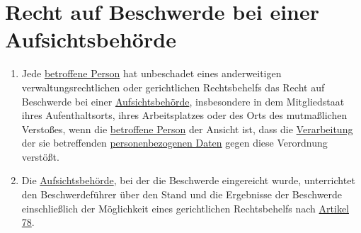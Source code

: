 \chapter{Recht auf Beschwerde bei einer Aufsichtsbehörde}
\label{ch:77}


\begin{enumerate}

  \item Jede \hyperref[itm:04-1]{betroffene Person} hat unbeschadet eines anderweitigen verwaltungsrechtlichen oder gerichtlichen
   Rechtsbehelfs das Recht auf Beschwerde bei einer \hyperref[itm:04-21]{Aufsichtsbehörde}, insbesondere in dem Mitgliedstaat ihres
   Aufenthaltsorts, ihres Arbeitsplatzes oder des Orts des mutmaßlichen Verstoßes, wenn die \hyperref[itm:04-1]{betroffene Person} der
   Ansicht ist, dass die \hyperref[itm:04-2]{Verarbeitung} der sie betreffenden \hyperref[itm:04-1]{personenbezogenen Daten} gegen diese Verordnung verstößt.
  \label{itm:77-1}

  \item Die \hyperref[itm:04-21]{Aufsichtsbehörde}, bei der die Beschwerde eingereicht wurde, unterrichtet den Beschwerdeführer über den Stand
   und die Ergebnisse der Beschwerde einschließlich der Möglichkeit eines gerichtlichen Rechtsbehelfs nach \hyperref
   [ch:78]{Artikel 78}.
  \label{itm:77-2}

\end{enumerate}


